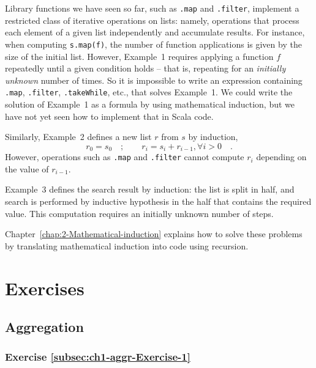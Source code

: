 Library functions we have seen so far, such as \texttt{}\lstinline!.map!
and \lstinline!.filter!,
implement a restricted class of iterative operations on lists: namely,
operations that process each element of a given list independently
and accumulate results. For instance, when computing \lstinline!s.map(f)!,
the number of function applications is given by the size of the initial
list. However, Example\ 1 requires applying a function $f$ repeatedly
until a given condition holds – that is, repeating for an \emph{initially
unknown} number of times. So it is impossible to write an expression
containing \lstinline!.map!,
\lstinline!.filter!, \lstinline!.takeWhile!,
etc., that solves Example\ 1. We could write the solution of Example\ 1
as a formula by using mathematical induction, but we have not yet
seen how to implement that in Scala code. 

Similarly, Example\ 2 defines a new list $r$ from $s$ by induction,
\[
r_{0}=s_{0}\quad;\quad\quad r_{i}=s_{i}+r_{i-1},\forall i>0\quad.
\]
However, operations such as \texttt{}\lstinline!.map!
and \texttt{}\lstinline!.filter!
cannot compute $r_{i}$ depending on the value of $r_{i-1}$.

Example\ 3 defines the search result by induction: the list is split
in half, and search is performed by inductive hypothesis in the half
that contains the required value. This computation requires an initially
unknown number of steps.

Chapter\ \ref{chap:2-Mathematical-induction} explains how to solve
these problems by translating mathematical induction into code using
recursion.

\section{Exercises\label{sec:Chapter-1-Exercises}}

\subsection{Aggregation}

\subsubsection{Exercise \label{subsec:ch1-aggr-Exercise-1}\ref{subsec:ch1-aggr-Exercise-1}}

